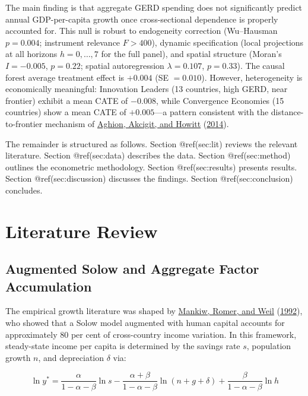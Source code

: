 \documentclass[
  11pt,
]{article}
\begin{document}
The main finding is that aggregate GERD spending does not significantly predict annual GDP-per-capita growth once cross-sectional dependence is properly accounted for. This null is robust to endogeneity correction (Wu--Hausman \(p = 0.004\); instrument relevance \(F > 400\)), dynamic specification (local projections at all horizons \(h = 0, \ldots, 7\) for the full panel), and spatial structure (Moran's \(I = -0.005\), \(p = 0.22\); spatial autoregression \(\lambda = 0.107\), \(p = 0.33\)). The causal forest average treatment effect is \(+0.004\) (SE \(= 0.010\)). However, heterogeneity is economically meaningful: Innovation Leaders (13 countries, high GERD, near frontier) exhibit a mean CATE of \(-0.008\), while Convergence Economies (15 countries) show a mean CATE of \(+0.005\)---a pattern consistent with the distance-to-frontier mechanism of \protect\hyperlink{ref-aghion2014}{Aghion, Akcigit, and Howitt} (\protect\hyperlink{ref-aghion2014}{2014}).

The remainder is structured as follows. Section @ref(sec:lit) reviews the relevant literature. Section @ref(sec:data) describes the data. Section @ref(sec:method) outlines the econometric methodology. Section @ref(sec:results) presents results. Section @ref(sec:discussion) discusses the findings. Section @ref(sec:conclusion) concludes.

\hypertarget{sec:lit}{%
\section{Literature Review}\label{sec:lit}}

\hypertarget{augmented-solow-and-aggregate-factor-accumulation}{%
\subsection{Augmented Solow and Aggregate Factor Accumulation}\label{augmented-solow-and-aggregate-factor-accumulation}}

The empirical growth literature was shaped by \protect\hyperlink{ref-mankiw1992}{Mankiw, Romer, and Weil} (\protect\hyperlink{ref-mankiw1992}{1992}), who showed that a Solow model augmented with human capital accounts for approximately 80 per cent of cross-country income variation. In this framework, steady-state income per capita is determined by the savings rate \(s\), population growth \(n\), and depreciation \(\delta\) via:

\[\ln y^* = \frac{\alpha}{1-\alpha-\beta}\ln s - \frac{\alpha+\beta}{1-\alpha-\beta}\ln(n+g+\delta) + \frac{\beta}{1-\alpha-\beta}\ln h\]
\end{document}
